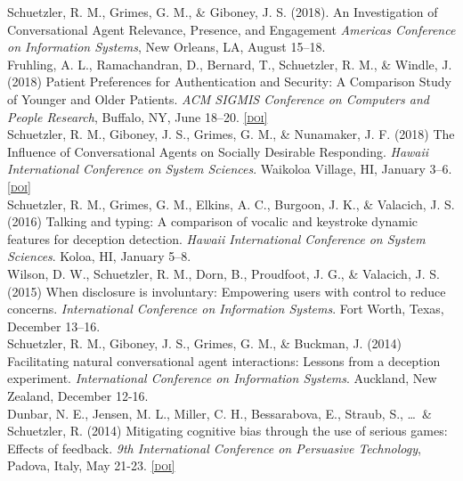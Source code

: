 \documentclass[10pt, letter]{article}
\newcommand{\doi}[1]{\href{#1}{\scriptsize\textsc{[doi]}}}
\newcommand{\years}[1]{\marginnote{\scriptsize #1}}
\begin{document}
\years{} Schuetzler, R. M., Grimes, G. M., \& Giboney, J. S. (2018).
An Investigation of Conversational Agent Relevance, Presence, and Engagement
\emph{Americas Conference on Information Systems}, New Orleans, LA, August 15--18.\\

\years{} Fruhling, A. L., Ramachandran, D., Bernard, T., Schuetzler, R. M., \& Windle, J. (2018)
Patient Preferences for Authentication and Security: A Comparison Study of Younger and Older Patients.
\emph{ACM SIGMIS Conference on Computers and People Research}, Buffalo, NY, June 18--20. \doi{https://doi.org/10.1145/3209626.3209702}\\

\years{} Schuetzler, R. M., Giboney, J. S., Grimes, G. M., \& Nunamaker, J.
F. (2018) The Influence of Conversational Agents on Socially Desirable
Responding. \emph{Hawaii International Conference on System Sciences}. Waikoloa Village, HI, January 3--6. \doi{https://doi.org/10.24251/HICSS.2018.038}\\

\years{2016} Schuetzler, R. M., Grimes, G. M., Elkins, A. C., Burgoon, J. K., \&
Valacich, J. S. (2016) Talking and typing: A comparison of vocalic and keystroke
dynamic features for deception detection. \emph{Hawaii International Conference
	on System Sciences}. Koloa, HI, January 5--8.\\

\years{2015}Wilson, D. W., Schuetzler, R. M., Dorn, B., Proudfoot, J. G., \&
Valacich, J. S. (2015) When disclosure is involuntary: Empowering users with
control to reduce concerns. \emph{International Conference on Information
	Systems}. Fort Worth, Texas, December 13--16.\\

\years{2014}Schuetzler, R. M., Giboney, J. S., Grimes, G. M., \& Buckman,
J. (2014) Facilitating natural conversational agent interactions: Lessons from a
deception experiment. \emph{International Conference on Information Systems}. Auckland, New Zealand, December 12-16.\\

Dunbar, N. E., Jensen, M. L., Miller, C. H., Bessarabova, E.,
Straub, S., \ldots~\& Schuetzler, R. (2014) Mitigating cognitive bias through
the use of serious games: Effects of feedback. \emph{9th International
	Conference on
	Persuasive Technology}, Padova, Italy, May 21-23. \doi{https://doi.org/10.1007/978-3-319-07127-5_9}\\
\end{document}
